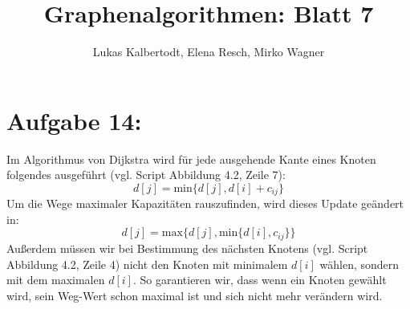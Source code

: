 \documentclass[11pt]{scrartcl} %
\title{Graphenalgorithmen: Blatt 7}
\author{Lukas Kalbertodt, Elena Resch, Mirko Wagner}
\begin{document}
\maketitle


\section*{Aufgabe 14:}

Im Algorithmus von Dijkstra wird für jede ausgehende Kante eines Knoten folgendes ausgeführt (vgl. Script Abbildung 4.2, Zeile 7):
\[d[j] = \text{min}\{d[j], d[i] + c_{ij}\}\]
Um die Wege maximaler Kapazitäten rauszufinden, wird dieses Update geändert in:
\[d[j] = \text{max}\{d[j], \text{min}\{d[i], c_{ij}\}\}\]
Außerdem müssen wir bei Bestimmung des nächsten Knotens (vgl. Script Abbildung 4.2, Zeile 4) nicht den Knoten mit minimalem $d[i]$ wählen, sondern mit dem maximalen $d[i]$. So garantieren wir, dass wenn ein Knoten gewählt wird, sein Weg-Wert schon maximal ist und sich nicht mehr verändern wird.
\end{document}
